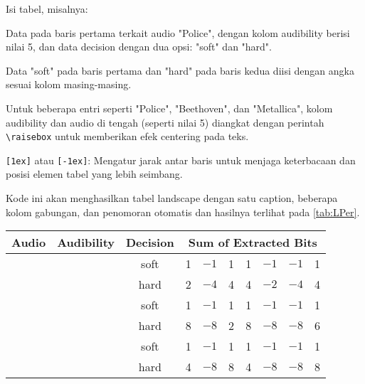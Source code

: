 \begin{packed_enum}
    \item Isi tabel, misalnya:
        \begin{packed_enum}
            \item Data pada baris pertama terkait audio "Police", dengan kolom audibility berisi nilai 5, dan data decision dengan dua opsi: "soft" dan "hard".
            \item Data "soft" pada baris pertama dan "hard" pada baris kedua diisi dengan angka sesuai kolom masing-masing.
            \item Untuk beberapa entri seperti "Police", "Beethoven", dan "Metallica", kolom audibility dan audio di tengah (seperti nilai 5) diangkat dengan perintah \texttt{\textbackslash raisebox} untuk memberikan efek centering pada teks.
        \end{packed_enum}
    \item \texttt{[1ex]} atau \texttt{[-1ex]}: Mengatur jarak antar baris untuk menjaga keterbacaan dan posisi elemen tabel yang lebih seimbang.
\end{packed_enum}

Kode ini akan menghasilkan tabel landscape dengan satu caption, beberapa kolom gabungan, dan penomoran otomatis dan hasilnya terlihat pada \cref{tab:LPer}.

\begin{sidewaystable}[htbp]
    \caption{Performance After Post Filtering}
    \label{tab:LPer}
    \centering
    \begin{tabular}{l c c rrrrrrr}
        \hline\hline
        Audio &Audibility & Decision &\multicolumn{7}{c}{Sum of Extracted Bits} 
        \\ [0.5ex] 
        \hline
        & &soft &1 & $-1$ & 1 & 1 & $-1$ & $-1$ & 1 \\[-1ex]
        \raisebox{1.5ex}{Police} & \raisebox{1.5ex}{5}&hard
        & 2 & $-4$ & 4 & 4 & $-2$ & $-4$ & 4 \\[1ex]
        & &soft & 1 & $-1$ & 1 & 1 & $-1$ & $-1$ & 1 \\[-1ex]
        \raisebox{1.5ex}{Beethoven} & \raisebox{1.5ex}{5}& hard
        &8 & $-8$ & 2 & 8 & $-8$ & $-8$ & 6 \\[1ex]
        & &soft & 1 & $-1$ & 1 & 1 & $-1$ & $-1$ & 1 \\[-1ex]
        \raisebox{1.5ex}{Metallica} & \raisebox{1.5ex}{5}& hard
        &4 & $-8$ & 8 & 4 & $-8$ & $-8$ & 8 \\[1ex]
        \hline
    \end{tabular}
\end{sidewaystable}

